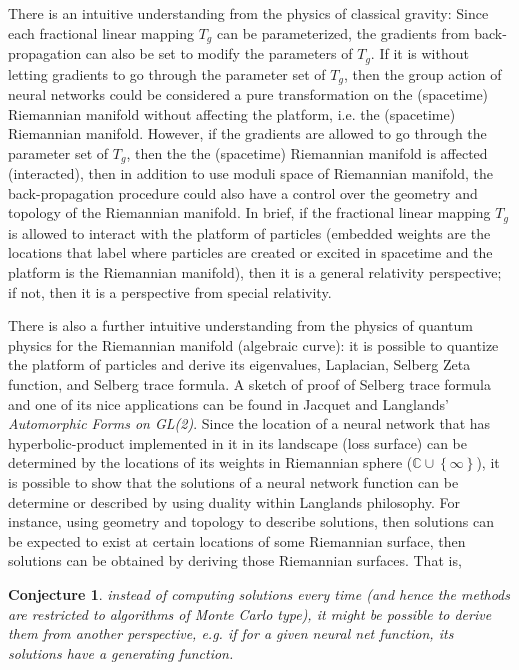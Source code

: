 \documentclass{article}
\theoremstyle{plain}
\theoremstyle{plain} %
\newtheorem{conjecture}{Conjecture}
\theoremstyle{definition}  %
\theoremstyle{remark}  %
\theoremstyle{plain}
\begin{document}
There is an intuitive understanding from the physics of classical gravity:
Since each fractional linear mapping $T_g$ can be parameterized\cite{seppala2011geometry, ford2004automorphic}, the gradients from back-propagation can also be set to modify the parameters of $T_g$. If it is without letting gradients to go through the parameter set of $T_g$, then the group action of neural networks could be considered a pure transformation on the (spacetime) Riemannian manifold without affecting the platform, i.e. the (spacetime) Riemannian manifold. However, if the gradients are allowed to go through the parameter set of $T_g$, then the the (spacetime) Riemannian manifold is affected (interacted), then in addition to use moduli space of Riemannian manifold, the back-propagation procedure could also have a control over the geometry and topology of the Riemannian manifold.
In brief, if the fractional linear mapping $T_g$ is allowed to interact with the platform of particles (embedded weights are the locations that label where particles are created or excited in spacetime and the platform is the Riemannian manifold), then it is a general relativity perspective\cite{misner1973gravitation}; if not, then it is a perspective from special relativity\cite{misner1973gravitation}.

There is also a further intuitive understanding from the physics of quantum physics for the Riemannian manifold (algebraic curve\cite{hori2003mirror}): it is possible to quantize the platform of particles and derive its eigenvalues, Laplacian, Selberg Zeta function, and Selberg trace formula\cite{borthwick2007spectral, nlab:selberg_zeta_function, jacquet2006automorphic}. A sketch of proof of Selberg trace formula and one of its nice applications can be found in Jacquet and Langlands' \textit{Automorphic Forms on GL(2)}\cite{jacquet2006automorphic}.
Since the location of a neural network that has hyperbolic-product implemented in it in its landscape (loss surface) can be determined by the locations of its weights in Riemannian sphere ($\mathbb{C}\cup \left\lbrace \infty \right\rbrace$), it is possible to show that the solutions of a neural network function can be determine or described by using duality within Langlands philosophy. For instance, using geometry and topology to describe solutions, then solutions can be expected to exist at certain locations of some Riemannian surface, then solutions can be obtained by deriving those Riemannian surfaces. That is, 
\begin{conjecture} instead of computing solutions every time (and hence the methods are restricted to algorithms of Monte Carlo type), it might be possible to derive them from another perspective, e.g. if for a given neural net function, its solutions have a generating function. 
\end{conjecture}
\end{document}
